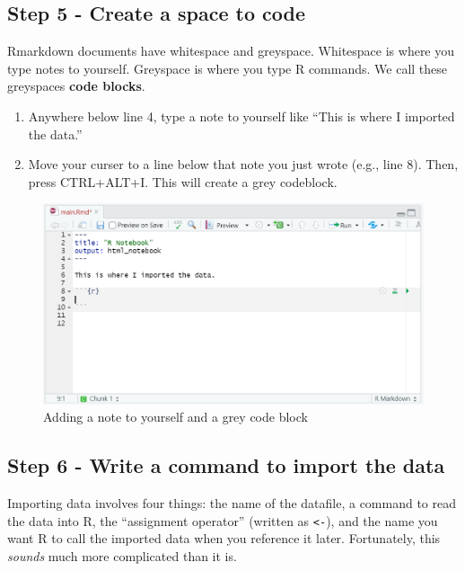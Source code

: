 \documentclass[
]{book}
\providecommand{\tightlist}{%
  \setlength{\itemsep}{0pt}\setlength{\parskip}{0pt}}
\begin{document}
\hypertarget{step-5---create-a-space-to-code}{%
\subsection{Step 5 - Create a space to code}\label{step-5---create-a-space-to-code}}

Rmarkdown documents have whitespace and greyspace. Whitespace is where you type notes to yourself. Greyspace is where you type R commands. We call these greyspaces \textbf{code blocks}.

\begin{enumerate}
\def\labelenumi{\arabic{enumi}.}
\tightlist
\item
  Anywhere below line 4, type a note to yourself like ``This is where I imported the data.''
\item
  Move your curser to a line below that note you just wrote (e.g., line 8). Then, press CTRL+ALT+I. This will create a grey codeblock.
\end{enumerate}

\begin{figure}

{\centering \includegraphics[width=0.8\linewidth]{images/code_block} 

}

\caption{Adding a note to yourself and a grey code block}\label{fig:unnamed-chunk-8}
\end{figure}

\hypertarget{step-6---write-a-command-to-import-the-data}{%
\subsection{Step 6 - Write a command to import the data}\label{step-6---write-a-command-to-import-the-data}}

Importing data involves four things: the name of the datafile, a command to read the data into R, the ``assignment operator'' (written as \texttt{\textless{}-}), and the name you want R to call the imported data when you reference it later. Fortunately, this \emph{sounds} much more complicated than it is.
\end{document}
